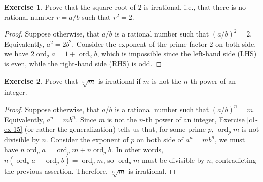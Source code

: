 \documentclass{article}
\theoremstyle{definition}
\newtheorem{exercise}{Exercise}
\begin{document}
\newpage

\begin{exercise}
Prove that the square root of $2$ is irrational, i.e., that there is no rational number $r = a/b$ such that $r^2 = 2$.
\end{exercise}
\begin{proof}
Suppose otherwise, that $a/b$ is a rational number such that $(a/b)^2 = 2$. Equivalently, $a^2 = 2b^2$. Consider the exponent of the prime factor $2$ on both side, we have $2 \operatorname{ord}_2 a = 1 + \operatorname{ord}_2 b$, which is impossible since the left-hand side (LHS) is even, while the right-hand side (RHS) is odd.
\end{proof}
\begin{exercise}
Prove that $\sqrt[n]{m}$ is irrational if $m$ is not the $n$-th power of an integer.
\end{exercise}
\begin{proof}
Suppose otherwise, that $a/b$ is a rational number such that $(a/b)^n = m$. Equivalently, $a^n = m b^n$. Since $m$ is not the $n$-th power of an integer, \hyperref[c1-ex-15]{Exercise \ref*{c1-ex-15}} (or rather the generalization) tells us that, for some prime $p$, $\operatorname{ord}_p m$ is not divisible by $n$. Consider the exponent of $p$ on both side of $a^n = m b^n$, we must have $n \operatorname{ord}_p a = \operatorname{ord}_p m + n \operatorname{ord}_p b$. In other words, $n (\operatorname{ord}_p a - \operatorname{ord}_p b) = \operatorname{ord}_p m$, so $\operatorname{ord}_p m$ must be divisible by $n$, contradicting the previous assertion. Therefore, $\sqrt[n]{m}$ is irrational.
\end{proof}

\newpage
\end{document}
